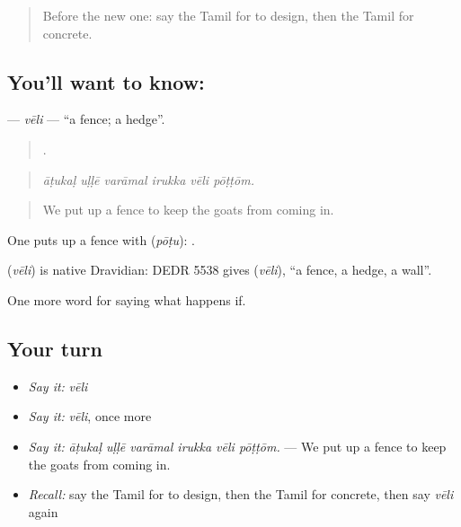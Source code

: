 \label{lesson:TA-C551-veli}



\begin{quote}
Before the new one: say the Tamil for to design, then the Tamil for concrete.
\end{quote}

\subsection*{You'll want to know: }
\textbf{} — \emph{vēli} — \textquotedblleft{}a fence; a hedge\textquotedblright{}.

\begin{quote}
     .
\end{quote}

\begin{quote}
\emph{āṭukaḷ uḷḷē varāmal irukka vēli pōṭṭōm.}
\end{quote}

\begin{quote}
We put up a fence to keep the goats from coming in.
\end{quote}

One puts up a fence with  (\emph{pōṭu}):  .

\begin{cousinweb}
\textbf{} (\emph{vēli}) is native Dravidian: DEDR 5538 gives  (\emph{vēli}), \textquotedblleft{}a fence, a hedge, a wall\textquotedblright{}.
\end{cousinweb}

\begin{grammarlens}[title={What you've built}]
One more word for saying what happens if.
\end{grammarlens}

\subsection*{Your turn}
\begin{itemize}
\raggedright
  \item \emph{Say it:} \emph{vēli}
  \item \emph{Say it:} \emph{vēli}, once more
  \item \emph{Say it:} \emph{āṭukaḷ uḷḷē varāmal irukka vēli pōṭṭōm.} — We put up a fence to keep the goats from coming in.
  \item \emph{Recall:} say the Tamil for to design, then the Tamil for concrete, then say \emph{vēli} again
\end{itemize}

